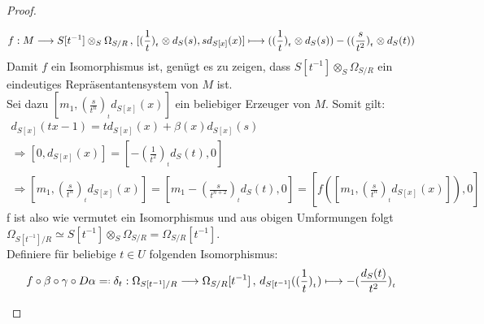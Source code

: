 \documentclass[10pt,a4paper]{report}
\newcommand{\comment}[1]{}
\newcommand{\function}[5]{\nolinebreak{#1:#2 \longrightarrow #3 \, , \, #4 \longmapsto #5}}
\newcommand{\divR}[2]{\Omega_{#1/#2}}
\newcommand{\divf}[1]{d_{#1}}
\newcommand{\Tensor}[3]{#1 \otimes_{#2} #3}
\newcommand{\tensor}[3]{#1 \otimes #3}
\newcommand{\lok}[2]{#1 [#2^{-1}]}
\newcommand{\loke}[3]{(\frac{#1}{#2})_{_{#3}}}
\newcommand*{\defeqr}{= \mathrel{\vcenter{\baselineskip0.5ex \lineskiplimit0pt
                     \hbox{\scriptsize.}\hbox{\scriptsize.}}}}
\begin{document}
\begin{proof}
\begin{itemize}
\begin{gather*}
\function{f}{M}{\Tensor{\lok{S}{t}}{S}{\divR{S}{R}}}{[\tensor{\loke{1}{t}{t}}{S}{\divf{S}(s)} , s \divf{S[x]}(x)]}{( \tensor{\loke{1}{t}{t}}{S}{\divf{S}(s)} ) - ( \tensor{\loke{s}{t^2}{t}}{S}{\divf{S}(t)} )}
\end{gather*}
Damit $f$ ein Isomorphismus ist, genügt es zu zeigen, dass $\Tensor{\lok{S}{t}}{S}{\divR{S}{R}}$ ein eindeutiges Repräsentantensystem von $M$ ist.\\
Sei dazu $[m_1,\loke{s}{t^{n}}{t}\divf{S[x]}(x)]$ ein beliebiger Erzeuger von $M$. Somit gilt:
\begin{gather*}
\divf{S[x]}(tx-1) = t\divf{S[x]}(x) + \beta(x)\divf{S[x]}(s)\\
\Rightarrow [0,\divf{S[x]}(x)] = [-\loke{1}{t^2}{t}\divf{S}(t),0]  \\ \comment{\label{\d_S[x] ~ d_S}}
\Rightarrow [m_1,\loke{s}{t^{n}}{t}\divf{S[x]}(x)] = [m_1 - \loke{s}{t^{n + 2}}{t}\divf{S}(t),0] = [f([m_1,\loke{s}{t^{n}}{t}\divf{S[x]}(x)]),0]
\end{gather*}
f ist also wie vermutet ein Isomorphismus und aus obigen Umformungen folgt
$\divR{\lok{S}{t}}{R} \simeq \Tensor{\lok{S}{t}}{S}{\divR{S}{R}} = \lok{\divR{S}{R}}{t}$. \\
Definiere für beliebige $t \in U$ folgenden Isomorphismus:
\begin{gather*}
f \circ \beta \circ \gamma  \circ D\alpha \defeqr \function{\delta_t}{\divR{\lok{S}{t}}{R}}{\lok{\divR{S}{R}}{t}}{\divf{\lok{S}{t}}(\loke{1}{t}{t})}{- \loke{\divf{S}(t)}{t^2}{t}}
\end{gather*}
\end{itemize}



\end{proof}
\end{document}
